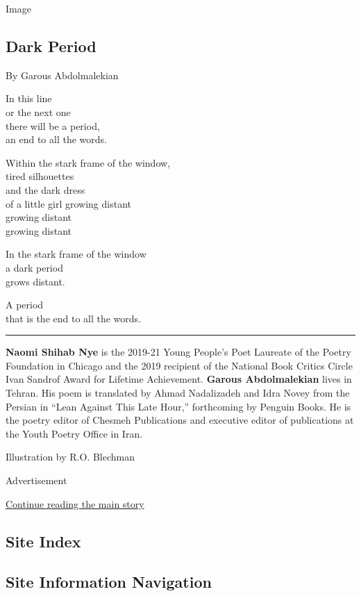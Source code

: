 Image

\hypertarget{dark-period}{%
\subsection{Dark Period}\label{dark-period}}

By Garous Abdolmalekian

In this line\\
or the next one\\
there will be a period,\\
an end to all the words.

Within the stark frame of the window,\\
tired silhouettes\\
and the dark dress\\
of a little girl growing distant\\
 growing distant\\
 growing distant

In the stark frame of the window\\
a dark period\\
grows distant.

A period\\
that is the end to all the words.

\begin{center}\rule{0.5\linewidth}{\linethickness}\end{center}

\textbf{Naomi Shihab Nye} is the 2019-21 Young People's Poet Laureate of
the Poetry Foundation in Chicago and the 2019 recipient of the National
Book Critics Circle Ivan Sandrof Award for Lifetime Achievement.
\textbf{Garous Abdolmalekian} lives in Tehran. His poem is translated by
Ahmad Nadalizadeh and Idra Novey from the Persian in ``Lean Against This
Late Hour,'' forthcoming by Penguin Books. He is the poetry editor of
Chesmeh Publications and executive editor of publications at the Youth
Poetry Office in Iran.

Illustration by R.O. Blechman

Advertisement

\protect\hyperlink{after-bottom}{Continue reading the main story}

\hypertarget{site-index}{%
\subsection{Site Index}\label{site-index}}

\hypertarget{site-information-navigation}{%
\subsection{Site Information
Navigation}\label{site-information-navigation}}

